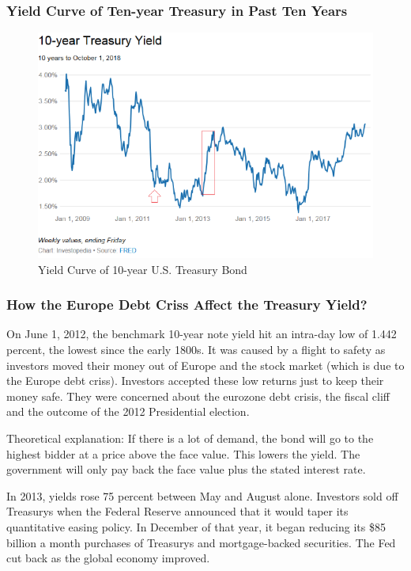 \subsubsection{Yield Curve of Ten-year Treasury in Past Ten Years}
\begin{figure}[H]
	\centering
	\includegraphics[width=\textwidth]{figures/2019-10-08-yield-curve.png}
	\caption{Yield Curve of 10-year U.S. Treasury Bond}
	\label{F:10yrs-yield-curve}
\end{figure}

\subsubsection{How the Europe Debt Criss Affect the Treasury Yield?}
On June 1, 2012, the benchmark 10-year note yield hit an intra-day low of 1.442 percent, the lowest since the early 1800s.  It was caused by a flight to safety as investors moved their money out of Europe and the stock market (which is due to the Europe debt criss). Investors accepted these low returns just to keep their money safe. They were concerned about the eurozone debt crisis, the fiscal cliff and the outcome of the 2012 Presidential election.

Theoretical explanation: If there is a lot of demand, the bond will go to the highest bidder at a price above the face value. This lowers the yield. The government will only pay back the face value plus the stated interest rate.

In 2013, yields rose 75 percent between May and August alone. Investors sold off Treasurys when the  Federal Reserve announced that it would taper its quantitative easing policy. In December of that year, it began reducing its \$85 billion a month purchases of Treasurys and mortgage-backed securities. The Fed cut back as the global economy improved.

